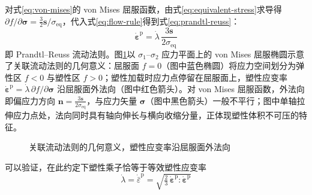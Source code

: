对式\eqref{eq:von-mises}的 von Mises 屈服函数，由式\eqref{eq:equivalent-stress}求导得 $\partial f/\partial\boldsymbol{\sigma}=\tfrac{3}{2}\mathbf{s}/\sigma_{\mathrm{eq}}$，代入式\eqref{eq:flow-rule}得到式\eqref{eq:prandtl-reuss}：
\begin{equation}
  \dot{\boldsymbol{\varepsilon}}^{\mathrm{p}}=\dot{\lambda}\,\frac{3\mathbf{s}}{2\sigma_{\mathrm{eq}}}
  \label{eq:prandtl-reuss}
\end{equation}
即 Prandtl–Reuss 流动法则。图\ref{fig:yield-surface-flow}以 $\sigma_{1}$–$\sigma_{2}$ 应力平面上的 von Mises 屈服椭圆示意了关联流动法则的几何意义：屈服面 $f=0$（图中蓝色椭圆）将应力空间划分为弹性区 $f<0$ 与塑性区 $f>0$；塑性加载时应力点停留在屈服面上，塑性应变率 $\dot{\boldsymbol{\varepsilon}}^{\mathrm{p}}=\dot{\lambda}\,\partial f/\partial\boldsymbol{\sigma}$ 沿屈服面外法向（图中红色箭头）。对 von Mises 屈服函数，外法向即偏应力方向 $\mathbf{n}=\tfrac{3\mathbf{s}}{2\sigma_{\mathrm{eq}}}$，与应力矢量 $\boldsymbol{\sigma}$（图中黑色箭头）一般不平行；图中单轴拉伸应力点处，法向同时具有轴向伸长与横向收缩分量，正体现塑性体积不可压的特征。
\begin{figure}[htbp]
  \centering
  \caption{关联流动法则的几何意义，塑性应变率沿屈服面外法向}
  \label{fig:yield-surface-flow}
\end{figure}
可以验证，在此约定下塑性乘子恰等于等效塑性应变率
\begin{equation}
  \dot{\lambda}=\dot{\bar{\varepsilon}}^{\mathrm{p}}=\sqrt{\tfrac{2}{3}\,\dot{\boldsymbol{\varepsilon}}^{\mathrm{p}}:\dot{\boldsymbol{\varepsilon}}^{\mathrm{p}}}
  \label{eq:plastic-multiplier-identity}
\end{equation}
